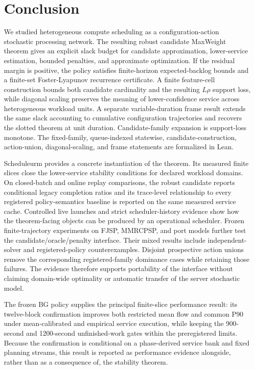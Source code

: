 \documentclass[opre,dblanonrev]{informs4}
\begin{document}
\section{Conclusion}
\label{sec:conclusion}

We studied heterogeneous compute scheduling as a configuration-action
stochastic processing network.  The resulting robust candidate MaxWeight
theorem gives an explicit slack budget for candidate approximation,
lower-service estimation, bounded penalties, and approximate optimization.  If
the residual margin is positive, the policy satisfies finite-horizon
expected-backlog bounds and a finite-set Foster-Lyapunov recurrence certificate.
A finite feature-cell construction bounds both candidate cardinality and the
resulting \(L\rho\) support loss, while diagonal scaling preserves the meaning of
lower-confidence service across heterogeneous workload units.  A separate
variable-duration frame result extends the same slack accounting to cumulative
configuration trajectories and recovers the slotted theorem at unit duration.
Candidate-family expansion is support-loss monotone.  The fixed-family,
queue-indexed statewise, candidate-construction, action-union, diagonal-scaling,
and frame statements are formalized in Lean.

Scheduleurm provides a concrete instantiation of the theorem.  Its measured
finite slices close the lower-service stability conditions for declared
workload domains.  On \UnifiedStaticComparisonCount{} closed-batch and
\UnifiedOnlineComparisonCount{} online replay comparisons, the robust candidate
reports conditional legacy completion ratios and its trace-level relationship to every
registered policy-semantics baseline is reported on the same measured service
cache.  Controlled live launches and strict scheduler-history evidence show how
the theorem-facing objects can be produced by an operational scheduler.  Frozen
finite-trajectory experiments on FJSP, MMRCPSP, and port models further test the
candidate/oracle/penalty interface.  Their mixed results include
independent-solver and registered-policy counterexamples.  Disjoint prospective
action unions remove the corresponding registered-family dominance cases while
retaining those failures.  The evidence therefore supports portability of the
interface without claiming domain-wide optimality or automatic transfer of the
server stochastic model.

The frozen BG policy supplies the principal finite-slice performance result:
its twelve-block confirmation improves both restricted mean flow and common P90
under mean-calibrated and empirical service execution, while keeping the
900-second and 1200-second unfinished-work gates within the preregistered
limits.  Because the confirmation is conditional on a phase-derived service
bank and fixed planning streams, this result is reported as performance
evidence alongside, rather than as a consequence of, the stability theorem.
\end{document}
